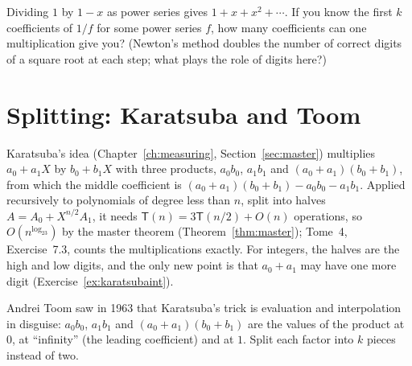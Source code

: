 \begin{think}
Dividing $1$ by $1-x$ as power series gives $1+x+x^2+\cdots$. If you know the first $k$ coefficients of $1/f$ for some power series $f$, how many coefficients can one multiplication give you? (Newton's method doubles the number of correct digits of a square root at each step; what plays the role of digits here?)
\end{think}

\section{Splitting: Karatsuba and Toom}\label{sec:toom}

Karatsuba's idea (Chapter~\ref{ch:measuring}, Section~\ref{sec:master}) multiplies $a_0+a_1X$ by $b_0+b_1X$ with three products, $a_0b_0$, $a_1b_1$ and $(a_0+a_1)(b_0+b_1)$, from which the middle coefficient is $(a_0+a_1)(b_0+b_1)-a_0b_0-a_1b_1$. Applied recursively to polynomials of degree less than
$n$, split into halves $A=A_0+X^{n/2}A_1$, it needs $\mathsf T(n)=3\mathsf T(n/2)+O(n)$ operations, so $O(n^{\log_23})$ by the master theorem (Theorem~\ref{thm:master}); Tome~4, Exercise~7.3, counts the multiplications exactly. For integers, the halves are the high and low digits, and the
only new point is that $a_0+a_1$ may have one more digit (Exercise~\ref{ex:karatsubaint}).

Andrei Toom saw in 1963 that Karatsuba's trick is evaluation and interpolation in disguise: $a_0b_0$, $a_1b_1$ and $(a_0+a_1)(b_0+b_1)$ are the values of the product at $0$, at ``infinity'' (the leading coefficient) and at $1$. Split each factor into $k$ pieces instead of two.

